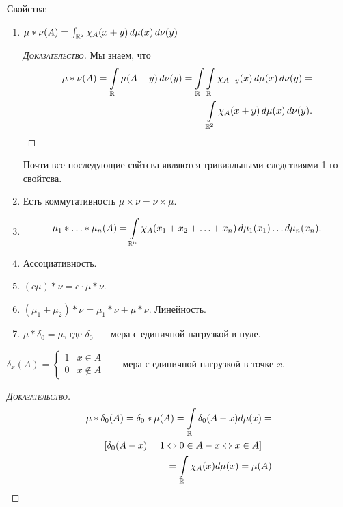 Свойства:
\begin{enumerate}
 \item $ \mu \ast \nu(A) = \int_{\mathbb{R}^{2}} \chi_{A}(x + y) \, d\mu(x)\, d\nu(y)   $
\begin{proof}[\normalfont\textsc{Доказательство}]
 Мы знаем, что
 \begin{align*}
 \mu \ast \nu(A) = \int\limits_{\mathbb{R}} \mu(A-y) \,d\nu(y) = \int\limits_{\mathbb{R}} \int\limits_{\mathbb{R}} \chi_{A-y}(x)\,d\mu(x)\,d\nu(y) = \\
 \int\limits_{\mathbb{R}^{2}}  \chi_A(x+y)\,d\mu(x)\,d\nu(y).
 \end{align*} 
\end{proof}

\begin{remrk*}
	Почти все последующие свйтсва являются тривиальными следствиями 1-го свойтсва.
\end{remrk*}

 \item Есть коммутативность $ \mu \times \nu = \nu \times \mu $.
 \item 
\begin{align*}
 \mu_1 \ast \ldots \ast \mu_n (A) = \int\limits_{\mathbb{R}^{n}}\chi_A(x_1 + x_2 + \ldots + x_n)\,d\mu_1(x_1) \ldots d\mu_n(x_n).   
\end{align*}
\item Ассоциативность.
\item $ (c\mu) \ast \nu = c \cdot \mu \ast \nu $.
\item $ (\mu_1 + \mu_2) \ast \nu = \mu_1 \ast \nu + \mu \ast \nu $. Линейность.
\item $ \mu \ast \delta_0 = \mu $, где $\delta_0$~--- мера с единичной нагрузкой в нуле.

\end{enumerate}
\begin{df}
	$ \delta_x(A) = \begin{cases} 1 & x \in A \\ 0 & x \notin A \end{cases} $~--- мера с единичной нагрузкой в точке $ x $.
\end{df}
\begin{proof}[\normalfont\textsc{Доказательство}]
		
	\begin{align*}
	\mu \ast \delta_0(A) = \delta_0 \ast \mu (A) = \int\limits_{\mathbb{R}} \delta_0(A - x) d \mu (x) = \\ 
	= \left[ \delta_0(A - x) = 1 \Leftrightarrow 0 \in A - x \Leftrightarrow x \in A \right] = \\ 
	= \int\limits_{\mathbb{R}} \chi_A(x) d \mu (x) = \mu (A)
	\end{align*}
	
\end{proof}

